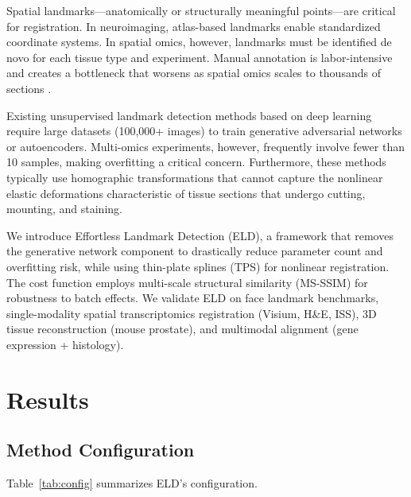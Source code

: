 \documentclass[11pt]{article}
\begin{document}
Spatial landmarks---anatomically or structurally meaningful points---are critical for registration. In neuroimaging, atlas-based landmarks enable standardized coordinate systems. In spatial omics, however, landmarks must be identified de novo for each tissue type and experiment. Manual annotation is labor-intensive and creates a bottleneck that worsens as spatial omics scales to thousands of sections \citep{chen2022spatiotemporal}.

Existing unsupervised landmark detection methods based on deep learning \citep{thewlis2017unsupervised, zhang2018unsupervised} require large datasets (100,000+ images) to train generative adversarial networks or autoencoders. Multi-omics experiments, however, frequently involve fewer than 10 samples, making overfitting a critical concern. Furthermore, these methods typically use homographic transformations that cannot capture the nonlinear elastic deformations characteristic of tissue sections that undergo cutting, mounting, and staining.

We introduce Effortless Landmark Detection (ELD), a framework that removes the generative network component to drastically reduce parameter count and overfitting risk, while using thin-plate splines (TPS) \citep{bookstein1989principal} for nonlinear registration. The cost function employs multi-scale structural similarity (MS-SSIM) \citep{wang2019ssim} for robustness to batch effects. We validate ELD on face landmark benchmarks, single-modality spatial transcriptomics registration (Visium, H\&E, ISS), 3D tissue reconstruction (mouse prostate), and multimodal alignment (gene expression + histology).

\section{Results}

\subsection{Method Configuration}

Table~\ref{tab:config} summarizes ELD's configuration.
\end{document}
